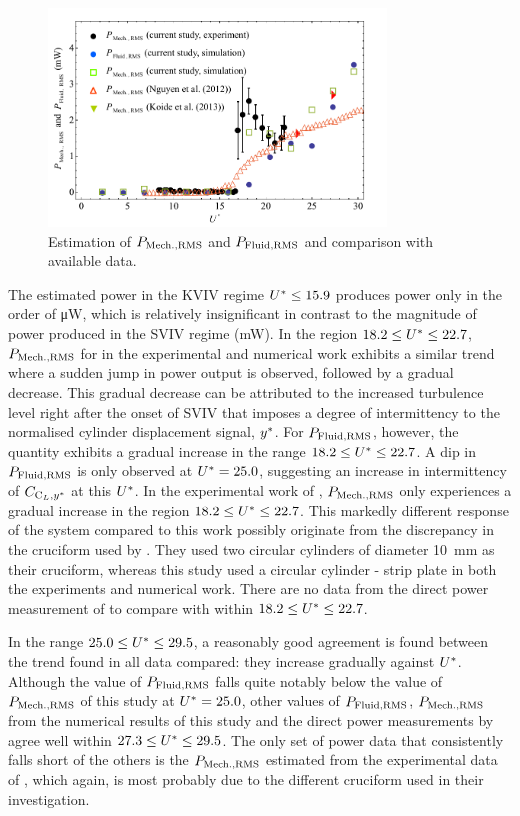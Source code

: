 \documentclass[oneside]{utmthesis}
\begin{document}
\begin{figure}[H]
  \centering
  \includegraphics[width=0.8\textwidth]{figs/powerComparison}
  \caption{Estimation of $P_{\text{Mech.,RMS}}$ and $P_{\text{Fluid,RMS}}$ and comparison with available data.}
  \label{fig:powerComparison}
\end{figure}

The estimated power in the KVIV regime $U^{*} \leq 15.9$ produces power only in the order of \si{\micro\watt}, which is relatively insignificant in contrast to the magnitude of power produced in the SVIV regime (mW). In the region $18.2 \leq U^{*} \leq 22.7$, $P_{\text{Mech.,RMS}}$ for in the experimental and numerical work exhibits a similar trend where a sudden jump in power output is observed, followed by a gradual decrease. This gradual decrease can be attributed to the increased turbulence level right after the onset of SVIV that imposes a degree of intermittency to the normalised cylinder displacement signal, $y^{*}$. For $P_{\text{Fluid,RMS}}$, however, the quantity exhibits a gradual increase in the range $18.2 \leq U^{*} \leq 22.7$. A dip in $P_{\text{Fluid,RMS}}$ is only observed at $U^{*} = 25.0$, suggesting an increase in intermittency of $C_{\text{C}_{L},y^{*}}$ at this $U^{*}$. In the experimental work of \citet{Nguyen2012}, $P_{\text{Mech.,RMS}}$ only experiences a gradual increase in the region $18.2 \leq U^{*} \leq 22.7$. This markedly different response of the system compared to this work possibly originate from the discrepancy in the cruciform used by \citet{Nguyen2012}. They used two circular cylinders of diameter \SI{10}{\milli\metre} as their cruciform, whereas this study used a circular cylinder - strip plate in both the experiments and numerical work. There are no data from the direct power measurement of \citet{Koide2013} to compare with within $18.2 \leq U^{*} \leq 22.7$.

In the range $25.0 \leq U^{*} \leq 29.5$, a reasonably good agreement is found between the trend found in all data compared: they increase gradually against $U^{*}$. Although the value of $P_{\text{Fluid,RMS}}$ falls quite notably below the value of $P_{\text{Mech.,RMS}}$ of this study at $U^{*} = 25.0$, other values of $P_{\text{Fluid,RMS}}$, $P_{\text{Mech.,RMS}}$ from the numerical results of this study and the direct power measurements by \citet{Koide2013} agree well within $27.3 \leq U^{*} \leq 29.5$. The only set of power data that consistently falls short of the others is the $P_{\text{Mech.,RMS}}$ estimated from the experimental data of \citet{Nguyen2012}, which again, is most probably due to the different cruciform used in their investigation.
\end{document}
